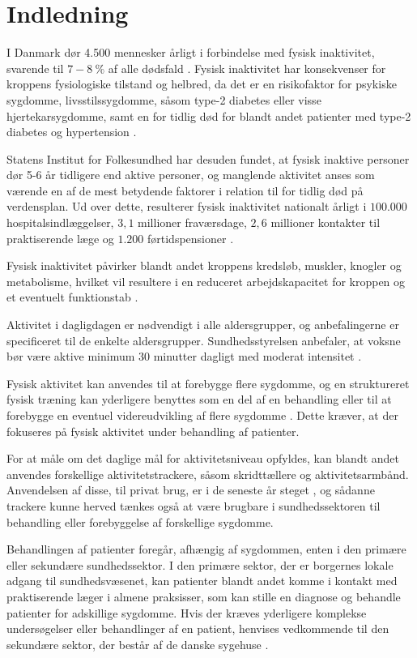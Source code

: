 \chapter{Indledning} \label{sec:indledning}
I Danmark dør 4.500 mennesker årligt i forbindelse med fysisk inaktivitet, svarende til $7-8~\%$ af alle dødsfald \citep{aagaard2014}. Fysisk inaktivitet har konsekvenser for kroppens fysiologiske tilstand og helbred, da det er en risikofaktor for psykiske sygdomme, livsstilssygdomme, såsom type-2 diabetes eller visse hjertekarsygdomme, samt en for tidlig død for blandt andet patienter med type-2 diabetes og hypertension \citep{motionsraad2007}. 

Statens Institut for Folkesundhed har desuden fundet, at fysisk inaktive personer dør 5-6 år tidligere end aktive personer, og manglende aktivitet anses som værende en af de mest betydende faktorer i relation til for tidlig død på verdensplan. Ud over dette, resulterer fysisk inaktivitet nationalt årligt i $100.000$ hospitalsindlæggelser, $3,1$ millioner fraværsdage, $2,6$ millioner kontakter til praktiserende læge og $1.200$ førtidspensioner \citep{christensen2012}.

Fysisk inaktivitet påvirker blandt andet kroppens kredsløb, muskler, knogler og metabolisme, hvilket vil resultere i en reduceret arbejdskapacitet for kroppen og et eventuelt funktionstab \citep{motionsraad2007}.

Aktivitet i dagligdagen er nødvendigt i alle aldersgrupper, og anbefalingerne er specificeret til de enkelte aldersgrupper.
Sundhedsstyrelsen anbefaler, at voksne bør være aktive minimum 30 minutter dagligt med moderat intensitet \citep{pedersen2011}.

Fysisk aktivitet kan anvendes til at forebygge flere sygdomme, og en struktureret fysisk træning kan yderligere benyttes som en del af en behandling eller til at forebygge en eventuel videreudvikling af flere sygdomme \citep{motionsraad2007}. Dette kræver, at der fokuseres på fysisk aktivitet under behandling af patienter.

For at måle om det daglige mål for aktivitetsniveau opfyldes, kan blandt andet anvendes forskellige aktivitetstrackere, såsom skridttællere og aktivitetsarmbånd. Anvendelsen af disse, til privat brug, er i de seneste år steget \citep{statista2016}, og sådanne trackere kunne herved tænkes også at være brugbare i sundhedssektoren til behandling eller forebyggelse af forskellige sygdomme.

Behandlingen af patienter foregår, afhængig af sygdommen, enten i den primære eller sekundære sundhedssektor. I den primære sektor, der er borgernes lokale adgang til sundhedsvæsenet, kan patienter blandt andet komme i kontakt med praktiserende læger i almene praksisser, som kan stille en diagnose og behandle patienter for adskillige sygdomme. Hvis der kræves yderligere komplekse undersøgelser eller behandlinger af en patient, henvises vedkommende til den sekundære sektor, der består af de danske sygehuse \citep{vedsted2014}. 

